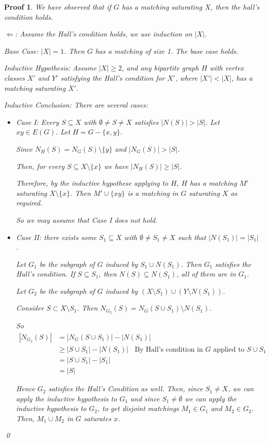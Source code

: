 \documentclass[twoside]{article}
\newtheorem{protoproof}[prototheorem]{Proof}
\renewenvironment{proof}
{\colorlet{shadecolor}{blue!15}\begin{shaded}\begin{protoproof}
		\normalfont}
		{\qed\end{protoproof}\end{shaded}}
\begin{document}
\begin{proof}
	We have observed that if $G$ has a matching saturating $X$, then the hall's condition holds. 
			
	$\Leftarrow$: Assume the Hall's condition holds, we use induction on $|X|$. 
			
	Base Case: $|X| = 1$. Then $G$ has a matching of size 1. The base case holds. 
			
	Inductive Hypothesis: Assume $|X| \geq 2$, and any bipartite graph $H$ with vertex classes $X'$ and $Y'$ satisfying the Hall's condition for $X'$, where $|X'| < |X|$, has a matching saturating $X'$. 
			
	Inductive Conclusion: There are several cases: \begin{itemize}
	\item Case I: Every $S \subseteq X$ with $\emptyset \neq S \neq X$ satisfies $|N(S)| > |S|$. Let $xy \in E(G)$. Let $H = G - \{x, y\}$. 
				
	Since $N_H(S) = N_G(S) \setminus \{y\}$ and $|N_G(S) | > |S|$. 
				
	Then, for every $S \subseteq X \setminus \{x\}$ we have $|N_H(S)| \geq |S|$. 
				
	Therefore, by the inductive hypothese applying to $H$, $H$ has a matching $M'$ saturating $X \setminus \{x\}$. Then $M' \cup \{xy\}$ is a matching in $G$ saturating $X$ as required. 
						
	So we may assume that Case I does not hold. 
	\item Case II: there exists some $S_1 \subseteq X$ with $\emptyset \neq S_1 \neq X$ such that $|N(S_1)| = |S_1|$. 
				
	Let $G_1$ be the subgraph of $G$ induced by $S_1 \cup N(S_1)$. Then $G_1$ satisfies the Hall's condition. If $S \subseteq S_1$, then $N(S) \subseteq N(S_1)$, all of them are in $G_1$.
				
	Let $G_2$ be the subgraph of $G$ induced by $(X \setminus S_1) \cup (Y \setminus N(S_1))$. 
				
	Consider $S \subset X \setminus S_1$. Then $N_{G_2}(S) = N_G(S \cup S_1) \setminus N(S_1)$. 
				
	So \begin{align*}
	|N_{G_2}(S)| &= |N_G(S \cup S_1)| - |N(S_1)|\\
	&\geq |S \cup S_1| - |N(S_1)| \;\; \text{ By Hall's condition in } G \text{ applied to } S \cup S_1\\
	&=|S \cup S_1| - |S_1|\\
	&= |S|
	\end{align*} 
			
	Hence $G_2$ satisfies the Hall's Condition as well. Then, since $S_1 \neq X$, we can apply the inductive hypothesis to $G_1$ and since $S_1 \neq \emptyset$ we can apply the inductive hypothesis to $G_2$, to get disjoint matchings $M_1 \in G_1$ and $M_2 \in G_2$. Then, $M_1 \cup M_2$ in $G$ saturates $x$. 
	\end{itemize}
\end{proof}
\end{document}
